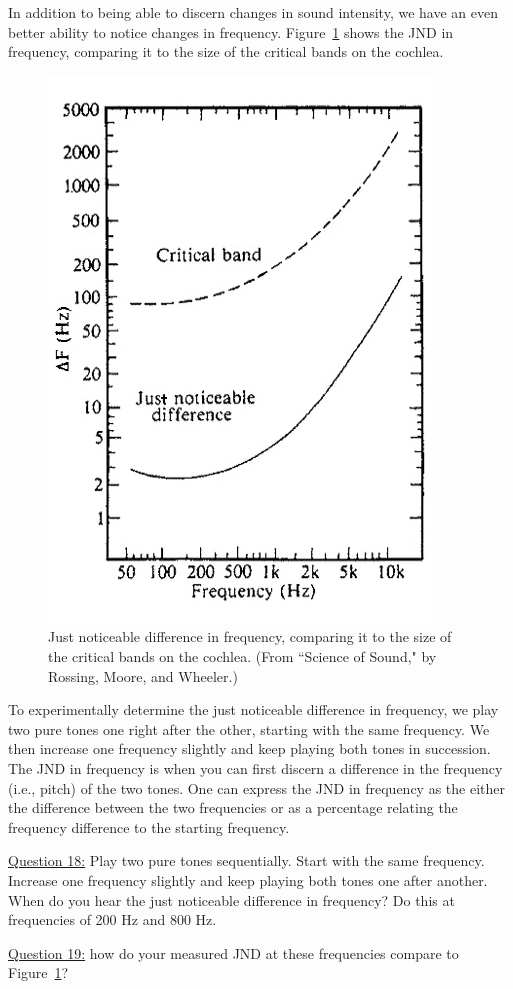 \documentclass[11pt]{NSF}
\begin{document}
In addition to being able to discern changes in sound intensity, 
we have an even better ability to notice changes in frequency. 
Figure~\ref{f:jnd_pitch} shows the JND in frequency, comparing 
it to the size of the critical bands on the cochlea.
%
\begin{figure}[hbtp]
\begin{center}
\includegraphics[width=.4\textwidth]{freqJNDa.jpg}
\caption{Just noticeable difference in frequency,
comparing it to the size of the critical bands on the cochlea.
(From ``Science of Sound," by Rossing, Moore, and Wheeler.)}
\label{f:jnd_pitch}
\end{center}
\end{figure}
%

To experimentally determine the just noticeable difference in
frequency, we play two pure tones one right after the other,
starting with the same frequency. 
We then increase one frequency slightly and keep playing both tones 
in succession.
The JND in frequency is when you can first discern a difference in 
the frequency (i.e., pitch) of the two tones.
One can express the JND in frequency as the either the 
difference between the two frequencies or as a percentage relating
the frequency difference to the starting frequency.

\underline{Question 18:} Play two pure tones sequentially. Start with the same frequency. Increase one frequency
slightly and keep playing both tones one after another. When do you hear the just noticeable
difference in frequency? Do this at frequencies of 200 Hz and 800 Hz.

\underline{Question 19:} how do your measured JND at these frequencies compare to Figure~\ref{f:jnd_pitch}?
\end{document}
